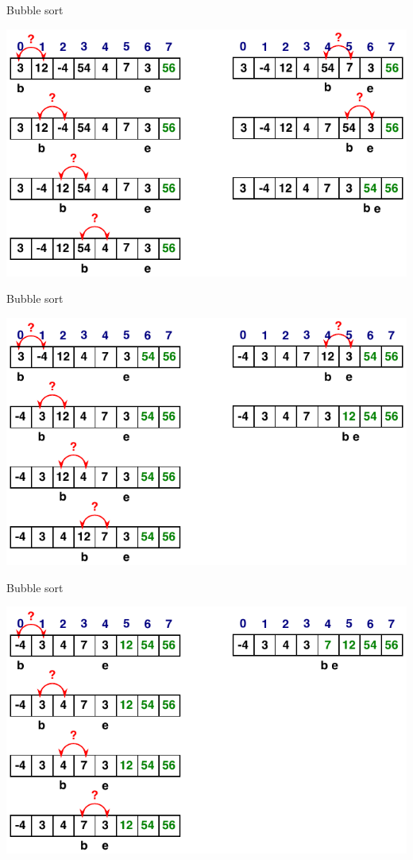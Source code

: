 \documentclass[usenames,dvipsnames,aspectratio=169]{beamer}
\begin{document}
\begin{frame}{Bubble sort}
  \begin{center}
    \includegraphics[scale=.9]{bubble_animation2.pdf}
  \end{center}
\end{frame}

\begin{frame}{Bubble sort}
  \begin{center}
    \includegraphics[scale=.9]{bubble_animation3.pdf}
  \end{center}
\end{frame}

\begin{frame}{Bubble sort}
  \begin{center}
    \includegraphics[scale=.9]{bubble_animation4.pdf}
  \end{center}
\end{frame}
\end{document}
